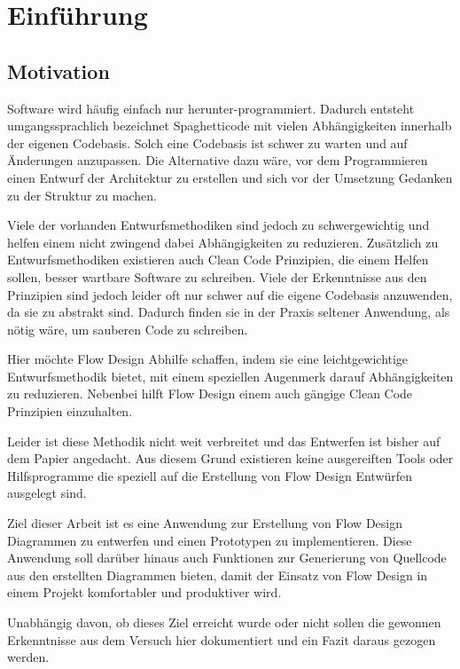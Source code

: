 
\chapter{Einführung}

\section{Motivation}

Software wird häufig einfach nur herunter-programmiert. Dadurch entsteht
umgangssprachlich bezeichnet Spaghetticode mit vielen Abhängigkeiten innerhalb
der eigenen Codebasis. Solch eine Codebasis ist schwer zu warten und auf
Änderungen anzupassen. Die Alternative dazu wäre, vor dem Programmieren einen
Entwurf der Architektur zu erstellen und sich vor der Umsetzung Gedanken zu
der Struktur zu machen.

Viele der vorhanden Entwurfsmethodiken sind jedoch zu schwergewichtig und helfen
einem nicht zwingend dabei Abhängigkeiten zu reduzieren.
Zusätzlich zu Entwurfsmethodiken existieren auch Clean Code Prinzipien, die
einem Helfen sollen, besser wartbare Software zu schreiben. Viele der
Erkenntnisse aus den Prinzipien sind jedoch leider oft nur schwer auf die eigene
Codebasis anzuwenden, da sie zu abstrakt sind.
Dadurch finden sie in der Praxis seltener Anwendung, als nötig wäre, um sauberen
Code zu schreiben.

Hier möchte Flow Design Abhilfe schaffen, indem sie eine leichtgewichtige
Entwurfsmethodik bietet, mit einem speziellen Augenmerk darauf Abhängigkeiten
zu reduzieren. Nebenbei hilft Flow Design einem auch gängige Clean Code
Prinzipien einzuhalten. 

Leider ist diese Methodik nicht weit verbreitet und das
Entwerfen ist bisher auf dem Papier angedacht. Aus diesem Grund existieren keine
ausgereiften Tools oder Hilfsprogramme die speziell auf die Erstellung
von Flow Design Entwürfen ausgelegt sind. 

Ziel dieser Arbeit ist es eine Anwendung zur Erstellung von Flow Design Diagrammen 
zu entwerfen und einen Prototypen zu implementieren. Diese Anwendung soll darüber hinaus auch
Funktionen zur Generierung von Quellcode aus den erstellten Diagrammen bieten, damit
der Einsatz von Flow Design in einem Projekt komfortabler und produktiver wird.

Unabhängig davon, ob dieses Ziel erreicht wurde oder nicht sollen die gewonnen
Erkenntnisse aus dem Versuch hier dokumentiert und ein Fazit daraus gezogen werden.

